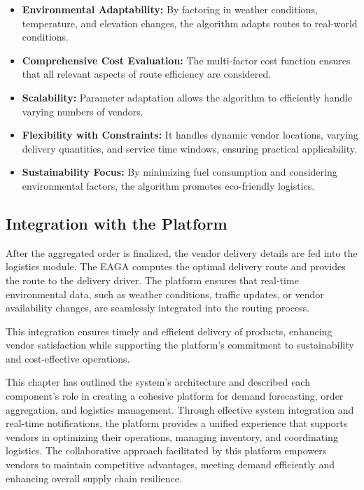 \begin{itemize}
    \item \textbf{Environmental Adaptability:} By factoring in weather conditions, temperature, and elevation changes, the algorithm adapts routes to real-world conditions.
    \item \textbf{Comprehensive Cost Evaluation:} The multi-factor cost function ensures that all relevant aspects of route efficiency are considered.
    \item \textbf{Scalability:} Parameter adaptation allows the algorithm to efficiently handle varying numbers of vendors.
    \item \textbf{Flexibility with Constraints:} It handles dynamic vendor locations, varying delivery quantities, and service time windows, ensuring practical applicability.
    \item \textbf{Sustainability Focus:} By minimizing fuel consumption and considering environmental factors, the algorithm promotes eco-friendly logistics.
\end{itemize}

\subsection{Integration with the Platform}

After the aggregated order is finalized, the vendor delivery details are fed into the logistics module. The EAGA computes the optimal delivery route and provides the route to the delivery driver. The platform ensures that real-time environmental data, such as weather conditions, traffic updates, or vendor availability changes, are seamlessly integrated into the routing process.

This integration ensures timely and efficient delivery of products, enhancing vendor satisfaction while supporting the platform's commitment to sustainability and cost-effective operations.

This chapter has outlined the system's architecture and described each component's role in creating a cohesive platform for demand forecasting, order aggregation, and logistics management. Through effective system integration and real-time notifications, the platform provides a unified experience that supports vendors in optimizing their operations, managing inventory, and coordinating logistics. The collaborative approach facilitated by this platform empowers vendors to maintain competitive advantages, meeting demand efficiently and enhancing overall supply chain resilience.
